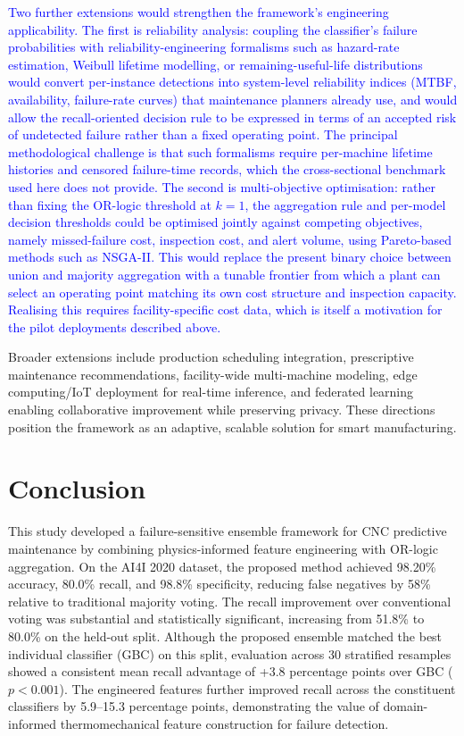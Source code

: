 \documentclass[final,5p, twocolumn]{elsarticle}
\begin{document}
\textcolor{blue}{Two further extensions would strengthen the framework's engineering applicability. The first is reliability analysis: coupling the classifier's failure probabilities with reliability-engineering formalisms such as hazard-rate estimation, Weibull lifetime modelling, or remaining-useful-life distributions would convert per-instance detections into system-level reliability indices (MTBF, availability, failure-rate curves) that maintenance planners already use, and would allow the recall-oriented decision rule to be expressed in terms of an accepted risk of undetected failure rather than a fixed operating point. The principal methodological challenge is that such formalisms require per-machine lifetime histories and censored failure-time records, which the cross-sectional benchmark used here does not provide. The second is multi-objective optimisation: rather than fixing the OR-logic threshold at $k=1$, the aggregation rule and per-model decision thresholds could be optimised jointly against competing objectives, namely missed-failure cost, inspection cost, and alert volume, using Pareto-based methods such as NSGA-II. This would replace the present binary choice between union and majority aggregation with a tunable frontier from which a plant can select an operating point matching its own cost structure and inspection capacity. Realising this requires facility-specific cost data, which is itself a motivation for the pilot deployments described above.}

Broader extensions include production scheduling integration, prescriptive maintenance recommendations, facility-wide multi-machine modeling, edge computing/IoT deployment for real-time inference, and federated learning enabling collaborative improvement while preserving privacy. These directions position the framework as an adaptive, scalable solution for smart manufacturing.

\section{Conclusion}
\color{blue}
This study developed a failure-sensitive ensemble framework for CNC predictive maintenance by combining physics-informed feature engineering with OR-logic aggregation. On the AI4I 2020 dataset, the proposed method achieved 98.20\% accuracy, 80.0\% recall, and 98.8\% specificity, reducing false negatives by 58\% relative to traditional majority voting. The recall improvement over conventional voting was substantial and statistically significant, increasing from 51.8\% to 80.0\% on the held-out split. Although the proposed ensemble matched the best individual classifier (GBC) on this split, evaluation across 30 stratified resamples showed a consistent mean recall advantage of +3.8 percentage points over GBC ($p<0.001$). The engineered features further improved recall across the constituent classifiers by 5.9--15.3 percentage points, demonstrating the value of domain-informed thermomechanical feature construction for failure detection.
\end{document}

